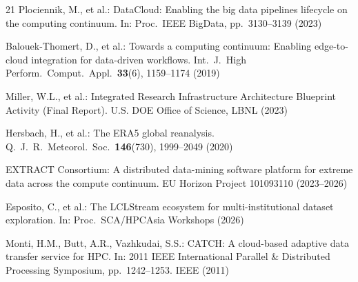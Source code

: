 \documentclass[runningheads]{llncs}
\begin{document}
\begin{thebibliography}{21}
Plociennik, M., et al.: DataCloud: Enabling the big data pipelines lifecycle on the computing continuum. In: Proc.\ IEEE BigData, pp.\ 3130--3139 (2023)

Balouek-Thomert, D., et al.: Towards a computing continuum: Enabling edge-to-cloud integration for data-driven workflows. Int.\ J.\ High Perform.\ Comput.\ Appl.\ \textbf{33}(6), 1159--1174 (2019)

Miller, W.L., et al.: Integrated Research Infrastructure Architecture Blueprint Activity (Final Report). U.S. DOE Office of Science, LBNL (2023)

Hersbach, H., et al.: The ERA5 global reanalysis. Q.\ J.\ R.\ Meteorol.\ Soc.\ \textbf{146}(730), 1999--2049 (2020)

EXTRACT Consortium: A distributed data-mining software platform for extreme data across the compute continuum. EU Horizon Project 101093110 (2023--2026)

Esposito, C., et al.: The LCLStream ecosystem for multi-institutional dataset exploration. In: Proc.\ SCA/HPCAsia Workshops (2026)

Monti, H.M., Butt, A.R., Vazhkudai, S.S.: CATCH: A cloud-based adaptive data transfer service for HPC. In: 2011 IEEE International Parallel \& Distributed Processing Symposium, pp.\ 1242--1253. IEEE (2011)


\end{thebibliography}
\end{document}
